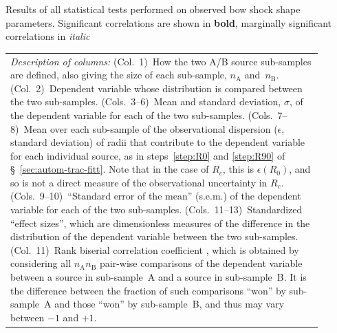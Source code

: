 \clearpage

\addtocounter{section}{1}
\begin{landscape}
\begin{table}
  \setlength\tabcolsep{3pt}
  \caption{Results of all statistical tests performed on observed bow shock shape parameters. Significant correlations are shown in \textbf{bold}, marginally significant correlations in \textit{italic}}
  \label{tab:big-p}
  
\end{table}
\end{landscape}
\begin{table}
  \begin{tabular}{p{0.9\linewidth}}
    \toprule
    \textit{Description of columns:}
    (Col.~1)~How the two A/B source sub-samples are defined, also giving the size of each sub-sample, \(n_{\text{A}}\) and~\(n_{\text{B}}\).
    (Col.~2)~Dependent variable whose distribution is compared between the two sub-samples.
    (Cols.~3--6)~Mean and standard deviation, \(\sigma\), of the dependent variable for each of the two sub-samples.
    (Cols.~7--8)~Mean over each sub-sample of the observational dispersion (\(\epsilon\), standard deviation) of radii that contribute to the dependent variable for each individual source, as in steps~\ref{step:R0} and \ref{step:R90} of \S~\ref{sec:autom-trac-fitt}.  Note that in the case of \(R_c\), this is \(\epsilon(R_0)\), and so is not a direct measure of the observational uncertainty in \(R_c\). 
    (Cols.~9--10)~``Standard error of the mean'' (s.e.m.) of the dependent variable for each of the two sub-samples. 
    (Cols.~11--13)~Standardized ``effect sizes'', which are dimensionless measures of the difference in the distribution of the dependent variable between the two sub-samples.
    (Col.~11)~Rank biserial correlation coefficient \citep{Cureton:1956a}, which is obtained by considering all \(n_{\text{A}} n_{\text{B}}\) pair-wise comparisons of the dependent variable between a source in sub-sample~A and a source in sub-sample~B.  It is the difference between the fraction of such comparisons ``won'' by sub-sample~A and those ``won'' by sub-sample~B, and thus may vary between \(-1\) and \(+1\). 

\end{tabular}
\end{table}
